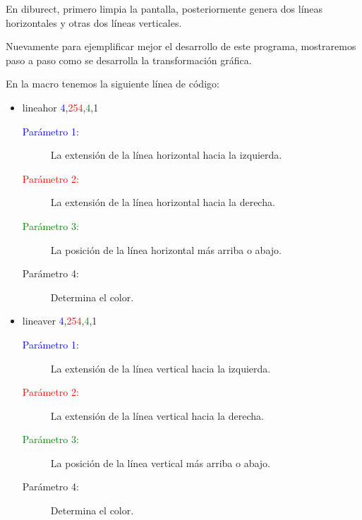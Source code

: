 \documentclass[letterpaper,12 pt,titlepage]{article}
\begin{document}
    En diburect, primero limpia la pantalla, posteriormente genera dos líneas horizontales y otras dos líneas verticales.

    Nuevamente para ejemplificar mejor el desarrollo de este programa, mostraremos paso a paso como se desarrolla la transformación gráfica.
    
    En la macro tenemos la siguiente línea de código:

    \begin{itemize}
        \item lineahor \textcolor{blue}{4},\textcolor{red}{254},\textcolor{green}{4},1 
        \begin{center}
            \begin{minipage}{0.85\linewidth}
                \begin{description}
                    \item[\textcolor{blue}{Parámetro 1:}] La extensión de la línea horizontal hacia la izquierda.
                    \item[\textcolor{red}{Parámetro 2:}] La extensión de la línea horizontal hacia la derecha.
                    \item[\textcolor{green}{Parámetro 3:}] La posición de la línea horizontal más arriba o abajo.
                    \item[Parámetro 4:] Determina el color.
                \end{description}
            \end{minipage}
        \end{center}

        \item lineaver \textcolor{blue}{4},\textcolor{red}{254},\textcolor{green}{4},1 
        \begin{center}
            \begin{minipage}{0.85\linewidth}
                \begin{description}
                    \item[\textcolor{blue}{Parámetro 1:}] La extensión de la línea vertical hacia la izquierda.
                    \item[\textcolor{red}{Parámetro 2:}] La extensión de la línea vertical hacia la derecha.
                    \item[\textcolor{green}{Parámetro 3:}] La posición de la línea vertical más arriba o abajo.
                    \item[Parámetro 4:] Determina el color.
                \end{description}
            \end{minipage}
        \end{center}
    \end{itemize}
    
\end{document}
